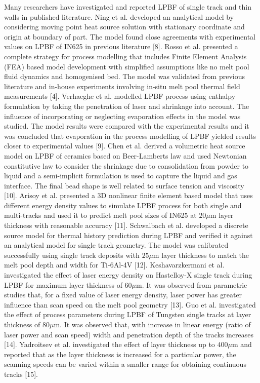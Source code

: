 \documentclass[10pt]{article}
\begin{document}
Many researchers have investigated and reported LPBF of single track and thin walls in published literature. Ning et al. developed an analytical model by considering moving point heat source solution with stationary coordinate and origin at boundary of part. The model found close agreements with experimental values on LPBF of IN625 in previous literature [8]. Rosso et al. presented a complete strategy for process modelling that includes Finite Element Analysis (FEA) based model development with simplified assumptions like no melt pool fluid dynamics and homogenised bed. The model was validated from previous literature and in-house experiments involving in-situ melt pool thermal field measurements [4]. Verhaeghe et al. modelled LPBF process using enthalpy formulation by taking the penetration of laser and shrinkage into account. The influence of incorporating or neglecting evaporation effects in the model was studied. The model results were compared with the experimental results and it was concluded that evaporation in the process modelling of LPBF yielded results closer to experimental values [9]. Chen et al. derived a volumetric heat source model on LPBF of ceramics based on Beer-Lamberts law and used Newtonian constitutive law to consider the shrinkage due to consolidation from powder to liquid and a semi-implicit formulation is used to capture the liquid and gas interface. The final bead shape is well related to surface tension and viscosity [10]. Arisoy et al. presented a 3D nonlinear finite element based model that uses different energy density values to simulate LPBF process for both single and multi-tracks and used it to predict melt pool sizes of IN625 at $20 \mu \mathrm{m}$ layer thickness with reasonable accuracy [11]. Schwalbach et al. developed a discrete source model for thermal history prediction during LPBF and verified it against an analytical model for single track geometry. The model was calibrated successfully using single track deposits with $25 \mu \mathrm{m}$ layer thickness to match the melt pool depth and width for Ti-6Al-4V [12]. Keshavarzkermani et al. investigated the effect of laser energy density on Hastelloy-X single track during LPBF for maximum layer thickness of $60 \mu \mathrm{m}$. It was observed from parametric studies that, for a fixed value of laser energy density, laser power has greater influence than scan speed on the melt pool geometry [13]. Guo et al. investigated the effect of process parameters during LPBF of Tungsten single tracks at layer thickness of $80 \mu \mathrm{m}$. It was observed that, with increase in linear energy (ratio of laser power and scan speed) width and penetration depth of the tracks increases [14]. Yadroitsev et al. investigated the effect of layer thickness up to $400 \mu \mathrm{m}$ and reported that as the layer thickness is increased for a particular power, the scanning speeds can be varied within a smaller range for obtaining continuous tracks [15].
\end{document}
